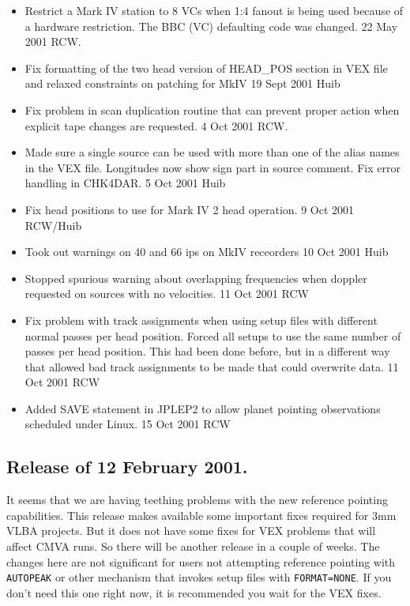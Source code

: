 \documentclass{report}
\begin{document}
\begin{itemize}
\item  Restrict a Mark IV station to 8 VCs when 1:4 fanout is being
       used because of a hardware restriction.  The BBC (VC) defaulting
       code was changed.  22 May 2001 RCW.

\item  Fix formatting of the two head version of HEAD\_POS section in
       VEX file and relaxed constraints on patching for MkIV
       19 Sept 2001 Huib

\item  Fix problem in scan duplication routine that can prevent proper
       action when explicit tape changes are requested.  4 Oct 2001 RCW.

\item  Made sure a single source can be used with more than one of the
       alias names in the VEX file. Longitudes now show sign part in
       source comment. Fix error handling in CHK4DAR.
       5 Oct 2001 Huib

\item  Fix head positions to use for Mark IV 2 head operation.
       9 Oct 2001  RCW/Huib

\item  Took out warnings on 40 and 66 ips on MkIV receorders 10 Oct
       2001 Huib

\item  Stopped spurious warning about overlapping frequencies when
       doppler requested on sources with no velocities.  11 Oct 2001 RCW

\item  Fix problem with track assignments when using setup files with
       different normal passes per head position.  Forced all setups
       to use the same number of passes per head position.  This had
       been done before, but in a different way that allowed bad track
       assignments to be made that could overwrite data.  11 Oct 2001 RCW

\item  Added SAVE statement in JPLEP2 to allow planet pointing observations
       scheduled under Linux.  15 Oct 2001 RCW

\end{itemize}

\subsection{\label{SSSEC:09FEB2001}Release of 12 February 2001.}

It seems that we are having teething problems with the new reference
pointing capabilities.  This release makes available some important
fixes required for 3mm VLBA projects.  But it does not have some fixes
for VEX problems that will affect CMVA runs.  So there will be another
release in a couple of weeks.  The changes here are not significant
for users not attempting reference pointing with {\tt AUTOPEAK} or
other mechanism that invokes setup files with {\tt FORMAT=NONE}.  If
you don't need this one right now, it is recommended you wait for
the VEX fixes.
\end{document}
